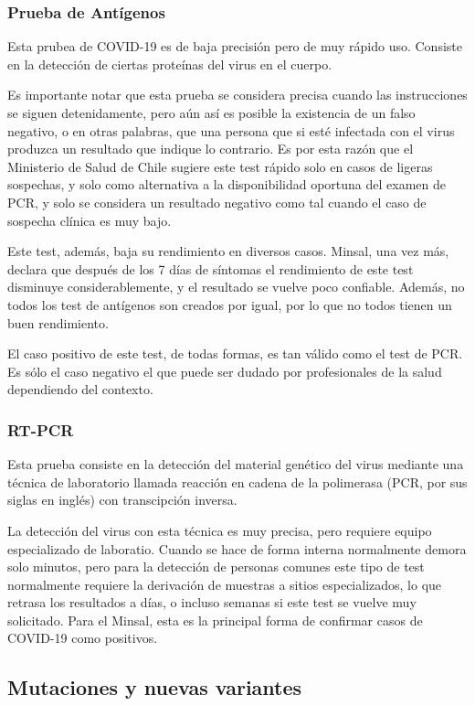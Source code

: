 \subsubsection*{Prueba de Antígenos}
Esta prubea de COVID-19 es de baja precisión pero de muy rápido uso. Consiste en la detección de ciertas proteínas del virus en el cuerpo.

Es importante notar que esta prueba se considera precisa cuando las instrucciones se siguen detenidamente, pero aún así es posible la existencia de un falso negativo, o en otras palabras, que una persona que si esté infectada con el virus produzca un resultado que indique lo contrario. Es por esta razón que el Ministerio de Salud de Chile sugiere este test rápido solo en casos de ligeras sospechas, y solo como alternativa a la disponibilidad oportuna del examen de PCR, y solo se considera un resultado negativo como tal cuando el caso de sospecha clínica es muy bajo. \cite{salud}

Este test, además, baja su rendimiento en diversos casos. Minsal, una vez más, declara que después de los 7 días de síntomas el rendimiento de este test disminuye considerablemente, y el resultado se vuelve poco confiable. Además, no todos los test de antígenos son creados por igual, por lo que no todos tienen un buen rendimiento.

El caso positivo de este test, de todas formas, es tan válido como el test de PCR. Es sólo el caso negativo el que puede ser dudado por profesionales de la salud dependiendo del contexto.

\subsubsection*{RT-PCR}
Esta prueba consiste en la detección del material genético del virus mediante una técnica de laboratorio llamada reacción en cadena de la polimerasa (PCR, por sus siglas en inglés) con transcipción inversa.

La detección del virus con esta técnica es muy precisa, pero requiere equipo especializado de laboratio. Cuando se hace de forma interna normalmente demora solo minutos, pero para la detección de personas comunes este tipo de test normalmente requiere la derivación de muestras a sitios especializados, lo que retrasa los resultados a días, o incluso semanas si este test se vuelve muy solicitado. Para el Minsal, esta es la principal forma de confirmar casos de COVID-19 como positivos.




\subsection*{Mutaciones y nuevas variantes}


